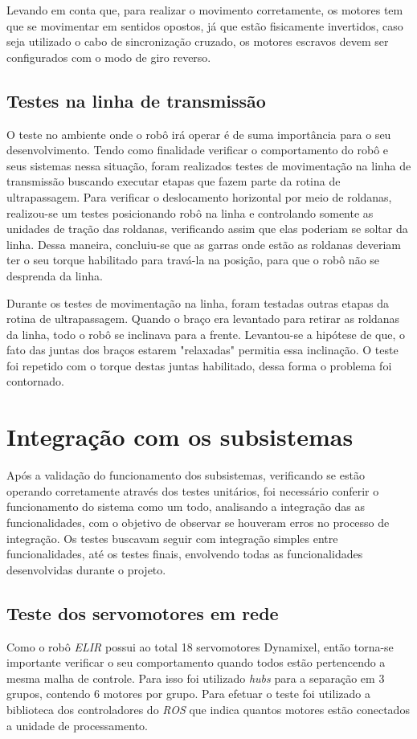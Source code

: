 Levando em conta que, para realizar o movimento corretamente, os motores tem que se movimentar em sentidos opostos, já que estão fisicamente invertidos, caso seja utilizado o cabo de sincronização cruzado, os motores escravos devem ser configurados com o modo de giro reverso.

\subsection{Testes na linha de transmissão}\label{sec:test_mov_lin}
O teste no ambiente onde o robô irá operar é de suma importância para o seu desenvolvimento. Tendo como finalidade verificar o comportamento do robô e seus sistemas  nessa situação, foram realizados testes de movimentação na linha de transmissão buscando executar etapas que fazem parte da rotina de ultrapassagem. Para verificar o deslocamento horizontal por meio de roldanas, realizou-se um testes posicionando robô na linha e controlando somente as unidades de tração das roldanas, verificando assim que elas poderiam se soltar da linha. Dessa maneira, concluiu-se que as garras onde estão as roldanas deveriam ter o seu torque habilitado para travá-la na posição, para que o robô não se desprenda da linha.

Durante os testes de movimentação na linha, foram testadas outras etapas da rotina de ultrapassagem. Quando o braço era levantado para retirar as roldanas da linha, todo o robô se inclinava para a frente.  Levantou-se a hipótese de que, o fato das juntas dos braços estarem "relaxadas" permitia essa inclinação. O teste foi repetido com o torque destas juntas habilitado, dessa forma o problema foi contornado.



\section{Integração com os subsistemas}\label{sec:int_subsis}
Após a validação do funcionamento dos subsistemas, verificando se estão operando corretamente através dos testes unitários, foi necessário conferir o funcionamento do sistema como um todo, analisando a integração das as funcionalidades, com o objetivo de observar se houveram erros no processo de integração. Os testes buscavam seguir com integração simples entre funcionalidades, até os testes finais, envolvendo todas as funcionalidades desenvolvidas durante o projeto.

\subsection{Teste dos servomotores em rede}\label{sec:test_serv_red}
Como o robô \textit{ELIR} possui ao total 18 servomotores Dynamixel, então torna-se  importante verificar o seu comportamento quando todos estão pertencendo a mesma malha de controle. Para isso foi utilizado \textit{hubs} para a separação em 3 grupos, contendo 6 motores por grupo. Para efetuar o teste foi utilizado a biblioteca dos controladores do \textit{ROS} que indica quantos motores estão conectados a unidade de processamento.

